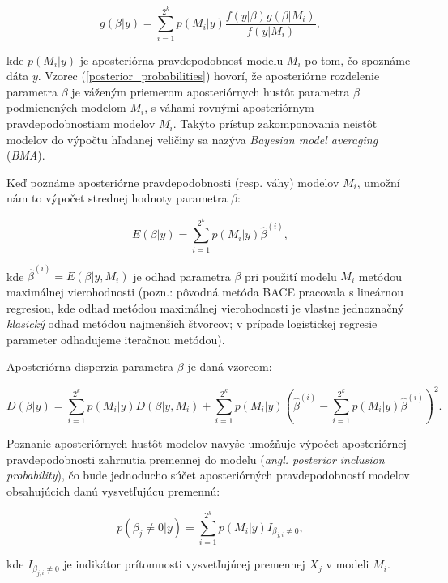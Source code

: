\begin{equation} \label{posterior_probabilities}
    g(\beta | y) = \sum_{i = 1}^{2^k} p(M_i | y) \frac{f(y | \beta) g(\beta | M_i)}{f(y | M_i)},
\end{equation}

kde \(p(M_i|y)\) je aposteriórna pravdepodobnosť modelu \(M_i\) po tom, čo spoznáme dáta \(y\).
Vzorec (\ref{posterior_probabilities}) hovorí, že aposteriórne rozdelenie parametra \(\beta\) je váženým priemerom aposteriórnych hustôt parametra \(\beta\) podmienených modelom \(M_i\),
s váhami rovnými aposteriórnym pravdepodobnostiam modelov \(M_i\).
Takýto prístup zakomponovania neistôt modelov do výpočtu hľadanej veličiny sa nazýva \emph{Bayesian model averaging} (\emph{BMA}).

Keď poznáme aposteriórne pravdepodobnosti (resp. váhy) modelov \( M_i \), umožní nám to výpočet strednej hodnoty parametra \( \beta \):

\begin{equation} \label{posterior_expected_value}
    E(\beta | y) = \sum_{i = 1}^{2^k} p(M_i | y) \hat{\beta}^{(i)},
\end{equation}

kde \( \hat{\beta}^{(i)} = E(\beta |y, M_i) \) je odhad parametra \( \beta \) pri použití modelu \( M_i \) metódou maximálnej vierohodnosti
(pozn.: pôvodná metóda BACE pracovala s lineárnou regresiou, kde odhad metódou maximálnej vierohodnosti je vlastne jednoznačný \emph{klasický} odhad metódou najmenších štvorcov;
v prípade logistickej regresie parameter odhadujeme iteračnou metódou).

Aposteriórna disperzia parametra \(\beta\) je daná vzorcom:

\[
    D(\beta | y) = \sum_{i = 1}^{2^k} p(M_i | y) D(\beta | y, M_i) + \sum_{i = 1}^{2^k} p(M_i | y) \left( \hat{\beta}^{(i)} - \sum_{i = 1}^{2^k} p(M_i | y) \hat{\beta}^{(i)} \right)^2.
\]

Poznanie aposteriórnych hustôt modelov navyše umožňuje výpočet aposteriórnej pravdepodobnosti zahrnutia premennej do modelu (\emph{angl. posterior inclusion probability}),
čo bude jednoducho súčet aposteriórných pravdepodobností modelov obsahujúcich danú vysvetľujúcu premennú:

\begin{equation} \label{posterior_inclusion_probability}
    p(\beta_j \neq 0 | y) = \sum_{i = 1}^{2^k} p(M_i | y) I_{\beta_{j, i} \neq 0},
\end{equation}

kde \( I_{\beta_{j, i} \neq 0} \) je indikátor prítomnosti vysvetľujúcej premennej \( X_j \) v modeli \( M_i \).

